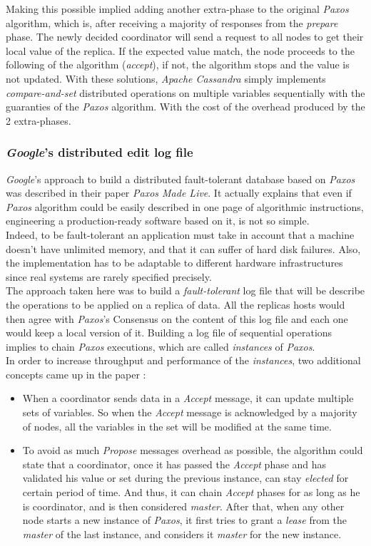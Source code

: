\documentclass[a4paper]{report}
\newcommand{\ca}{\emph{Apache Cassandra\xspace}}
\newcommand{\px}{\emph{Paxos\xspace}}
\begin{document}
Making this possible implied adding another extra-phase to the original \px{} algorithm, which is, after receiving a majority of responses from the \emph{prepare} phase. The newly decided coordinator will send a request to all nodes to get their local value of the replica. If the expected value match, the node proceeds to the following of the algorithm (\emph{accept}), if not, the algorithm stops and the value is not updated.
With these solutions, \ca{} simply implements \emph{compare-and-set} distributed operations on multiple variables sequentially with the guaranties of the \px{} algorithm. With the cost of the overhead produced by the 2 extra-phases.

\subsubsection{\emph{Google}'s distributed edit log file}
\emph{Google}'s approach to build a distributed fault-tolerant database based on \px{} was described in their paper \emph{Paxos Made Live}\cite{Google1}. It actually explains that even if \px{} algorithm could be easily described in one page of algorithmic instructions, engineering a production-ready software based on it, is not so simple.\\
Indeed, to be fault-tolerant an application must take in account that a machine doesn't have unlimited memory, and that it can suffer of hard disk failures. Also, the implementation has to be adaptable to different hardware infrastructures since real systems are rarely specified precisely.\\
The approach taken here was to build a \emph{fault-tolerant} log file that will be describe the operations to be applied on a replica of data. All the replicas hosts would then agree with \px{}'s Consensus on the content of this log file and each one would keep a local version of it. Building a log file of sequential operations implies to chain \px{} executions, which are called \emph{instances} of \emph{Paxos}.\\
In order to increase throughput and performance of the \emph{instances}, two additional concepts came up in the paper : 
\begin{itemize}
	\item When a coordinator sends data in a \emph{Accept} message, it can update multiple sets of variables. So when the \emph{Accept} message is acknowledged by a majority of nodes, all the variables in the set will be modified at the same time.
	\item To avoid as much \emph{Propose} messages overhead as possible, the algorithm could state that a coordinator, once it has passed the \emph{Accept} phase and has validated his value or set during the previous instance, can stay \emph{elected} for certain period of time. And thus, it can chain \emph{Accept} phases for as long as he is coordinator, and is then considered \emph{master}. After that, when any other node starts a new instance of \px{}, it first tries to grant a \emph{lease} from the \emph{master} of the last instance, and considers it \emph{master} for the new instance.
\end{itemize}
\end{document}
